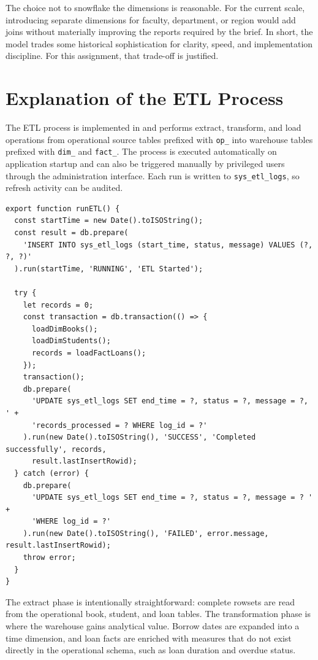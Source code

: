 \documentclass[12pt,a4paper]{article}
\begin{document}
The choice not to snowflake the dimensions is reasonable. For the current scale, introducing separate dimensions for faculty, department, or region would add joins without materially improving the reports required by the brief. In short, the model trades some historical sophistication for clarity, speed, and implementation discipline. For this assignment, that trade-off is justified.

\section{Explanation of the ETL Process}
The ETL process is implemented in  and performs extract, transform, and load operations from operational source tables prefixed with \texttt{op\_} into warehouse tables prefixed with \texttt{dim\_} and \texttt{fact\_}. The process is executed automatically on application startup and can also be triggered manually by privileged users through the administration interface. Each run is written to \texttt{sys\_etl\_logs}, so refresh activity can be audited.

\begin{lstlisting}[style=reportcode,caption={ETL control flow from server/etl.ts}]
export function runETL() {
  const startTime = new Date().toISOString();
  const result = db.prepare(
    'INSERT INTO sys_etl_logs (start_time, status, message) VALUES (?, ?, ?)'
  ).run(startTime, 'RUNNING', 'ETL Started');

  try {
    let records = 0;
    const transaction = db.transaction(() => {
      loadDimBooks();
      loadDimStudents();
      records = loadFactLoans();
    });
    transaction();
    db.prepare(
      'UPDATE sys_etl_logs SET end_time = ?, status = ?, message = ?, ' +
      'records_processed = ? WHERE log_id = ?'
    ).run(new Date().toISOString(), 'SUCCESS', 'Completed successfully', records,
      result.lastInsertRowid);
  } catch (error) {
    db.prepare(
      'UPDATE sys_etl_logs SET end_time = ?, status = ?, message = ? ' +
      'WHERE log_id = ?'
    ).run(new Date().toISOString(), 'FAILED', error.message, result.lastInsertRowid);
    throw error;
  }
}
\end{lstlisting}

The extract phase is intentionally straightforward: complete rowsets are read from the operational book, student, and loan tables. The transformation phase is where the warehouse gains analytical value. Borrow dates are expanded into a time dimension, and loan facts are enriched with measures that do not exist directly in the operational schema, such as loan duration and overdue status.
\end{document}

